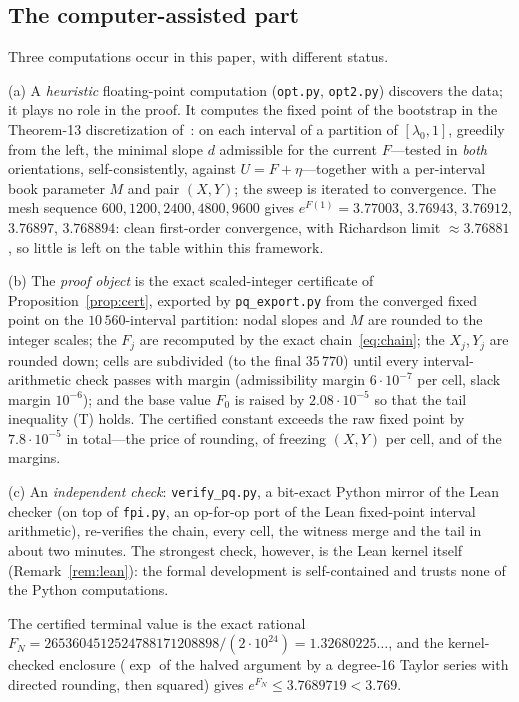 \documentclass[11pt]{article}
\theoremstyle{definition}
\newcommand{\lam}{\lambda}
\begin{document}
\subsection{The computer-assisted part}\label{sec:computer}

Three computations occur in this paper, with different status.

(a) A \emph{heuristic} floating-point computation (\texttt{opt.py}, \texttt{opt2.py}) discovers the data; it plays no role in the proof.  It computes the fixed point of the bootstrap in the Theorem-13 discretization of~\cite{GNNW}: on each interval of a partition of $[\lam_0,1]$, greedily from the left, the minimal slope $d$ admissible for the current $F$---tested in \emph{both} orientations, self-consistently, against $U=F+\eta$---together with a per-interval book parameter $M$ and pair $(X,Y)$; the sweep is iterated to convergence.  The mesh sequence $600,1200,2400,4800,9600$ gives $e^{F(1)}=3.77003$, $3.76943$, $3.76912$, $3.76897$, $3.768894$: clean first-order convergence, with Richardson limit $\approx3.76881$, so little is left on the table within this framework.

(b) The \emph{proof object} is the exact scaled-integer certificate of Proposition~\ref{prop:cert}, exported by \texttt{pq\_export.py} from the converged fixed point on the $10\,560$-interval partition: nodal slopes and $M$ are rounded to the integer scales; the $F_j$ are recomputed by the exact chain~\eqref{eq:chain}; the $X_j,Y_j$ are rounded down; cells are subdivided (to the final $35\,770$) until every interval-arithmetic check passes with margin (admissibility margin $6\cdot10^{-7}$ per cell, slack margin $10^{-6}$); and the base value $F_0$ is raised by $2.08\cdot10^{-5}$ so that the tail inequality (T) holds.  The certified constant exceeds the raw fixed point by $7.8\cdot10^{-5}$ in total---the price of rounding, of freezing $(X,Y)$ per cell, and of the margins.

(c) An \emph{independent check}: \texttt{verify\_pq.py}, a bit-exact Python mirror of the Lean checker (on top of \texttt{fpi.py}, an op-for-op port of the Lean fixed-point interval arithmetic), re-verifies the chain, every cell, the witness merge and the tail in about two minutes.  The strongest check, however, is the Lean kernel itself (Remark~\ref{rem:lean}): the formal development is self-contained and trusts none of the Python computations.

The certified terminal value is the exact rational $F_N=2653604512524788171208898/(2\cdot10^{24})=1.32680225\ldots$, and the kernel-checked enclosure ($\exp$ of the halved argument by a degree-16 Taylor series with directed rounding, then squared) gives $e^{F_N}\le3.7689719<3.769$.
\end{document}

